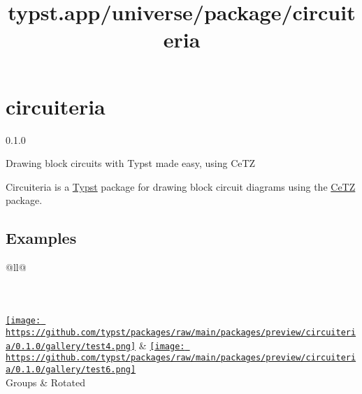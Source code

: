 \title{typst.app/universe/package/circuiteria}

\label{banner}
\section{circuiteria}\label{circuiteria}

{ 0.1.0 }

Drawing block circuits with Typst made easy, using CeTZ

\label{readme}
Circuiteria is a \href{https://typst.app/}{Typst} package for drawing
block circuit diagrams using the
\href{https://typst.app/universe/package/cetz}{CeTZ} package.


\subsection{Examples}\label{examples}

\begin{longtable}[]{@{}ll@{}}
\toprule\noalign{}
\endhead
\bottomrule\noalign{}
\endlastfoot
{} \\
 \\
 \\
 \\
\href{https://github.com/typst/packages/raw/main/packages/preview/circuiteria/0.1.0/gallery/test4.typ}{\texttt{[image: https://github.com/typst/packages/raw/main/packages/preview/circuiteria/0.1.0/gallery/test4.png]}}
&
\href{https://github.com/typst/packages/raw/main/packages/preview/circuiteria/0.1.0/gallery/test6.typ}{\texttt{[image: https://github.com/typst/packages/raw/main/packages/preview/circuiteria/0.1.0/gallery/test6.png]}} \\
Groups & Rotated \\
\end{longtable}

